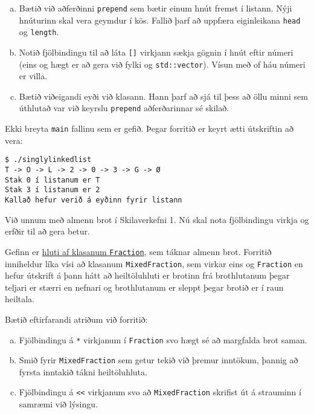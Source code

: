 \documentclass{article}
\begin{document}
\begin{enumerate}[a)]
	\item Bætið við aðferðinni \texttt{prepend} sem bætir einum hnút fremst í listann. Nýji hnúturinn skal vera geymdur í kös. Fallið þarf að uppfæra eiginleikana \texttt{head} og \texttt{length}.
	\item Notið fjölbindingu til að láta \texttt{[]} virkjann sækja gögnin í hnút eftir númeri (eins og hægt er að gera við fylki og \texttt{std::vector}). Vísun með of háu númeri er villa.
	\item Bætið viðeigandi eyði  við klasann. Hann þarf að sjá til þess að öllu minni sem úthlutað var við keyrslu \texttt{prepend} aðferðarinnar sé skilað.
\end{enumerate}

Ekki breyta \texttt{main} fallinu sem er gefið. Þegar forritið er keyrt ætti útskriftin að vera:

\begin{verbatim}
$ ./singlylinkedlist
T -> O -> L -> 2 -> 0 -> 3 -> G -> Ø
Stak 0 í listanum er T
Stak 3 í listanum er 2
Kallað hefur verið á eyðinn fyrir listann
\end{verbatim}

\question

Við unnum með almenn brot í Skilaverkefni 1. Nú skal nota fjölbindingu virkja og erfðir til að gera betur.

Gefinn er \href{https://raw.githubusercontent.com/Ernir/kennsluefni/master/T2/Code/w3/mixedfraction.cpp}{hluti af klasanum \texttt{Fraction}}, sem táknar almenn brot. Forritið inniheldur líka vísi að klasanum \texttt{MixedFraction}, sem virkar eins og \texttt{Fraction} en hefur útskrift á þann hátt að heiltöluhluti er brotinn frá brothlutanum þegar teljari er stærri en nefnari og brothlutanum er sleppt þegar brotið er í raun heiltala.

Bætið eftirfarandi atriðum við forritið:

\begin{enumerate}[a)]
	\item Fjölbindingu á \texttt{*} virkjanum í \texttt{Fraction} svo hægt sé að margfalda brot saman.
	\item Smið fyrir \texttt{MixedFraction} sem getur tekið við þremur inntökum, þannig að fyrsta inntakið tákni heiltöluhluta.
	\item Fjölbindingu á \texttt{<<} virkjanum svo að \texttt{MixedFraction} skrifist út á strauminn í samræmi við lýsingu.
\end{enumerate}
\end{document}
